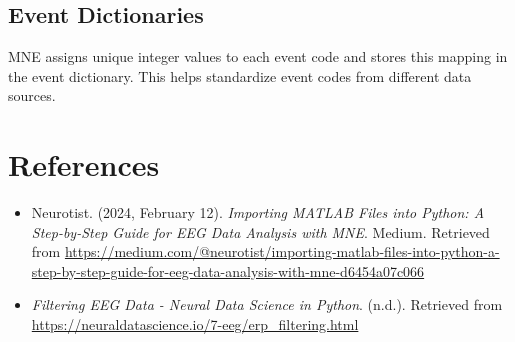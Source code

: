 \documentclass{article}
\begin{document}
\subsection{Event Dictionaries}
MNE assigns unique integer values to each event code and stores this mapping in the event dictionary. This helps standardize event codes from different data sources.

\section{References}
\begin{itemize}
    \item Neurotist. (2024, February 12). \emph{Importing MATLAB Files into Python: A Step-by-Step Guide for EEG Data Analysis with MNE}. Medium. Retrieved from \url{https://medium.com/@neurotist/importing-matlab-files-into-python-a-step-by-step-guide-for-eeg-data-analysis-with-mne-d6454a07c066}
    \item \emph{Filtering EEG Data - Neural Data Science in Python}. (n.d.). Retrieved from \url{https://neuraldatascience.io/7-eeg/erp_filtering.html}
\end{itemize}
\end{document}
